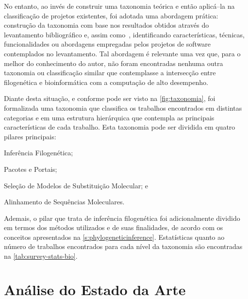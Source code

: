 \documentclass[english,brazilian]{UNISINOSmonografia} %
\begin{document}
No entanto, ao invés de construir uma taxonomia teórica e então aplicá--la na classificação de projetos existentes, foi adotada uma abordagem prática: construção  da taxonomia com base nos resultados obtidos através do levantamento bibliográfico e, assim como~\cite{Perera2013}, identificando características, técnicas, funcionalidades ou abordagens empregadas pelos projetos de software contemplados no levantamento.
Tal abordagem é relevante uma vez que, para o melhor do conhecimento do autor, não foram encontradas nenhuma outra taxonomia ou classificação similar que contemplasse a intersecção entre filogenética e bioinformática com a computação de alto desempenho.


Diante desta situação, e conforme pode ser visto na \autoref{fig:taxonomia}, foi formalizada uma taxonomia que classifica os trabalhos encontrados em distintas categorias e em uma estrutura hierárquica que contempla as principais características de cada trabalho.
Esta taxonomia pode ser dividida em quatro pilares principais:
\begin{inparaenum} 
	\item Inferência Filogenética;
	\item Pacotes e Portais;
	\item Seleção de Modelos de Substituição Molecular; e
	\item Alinhamento de Sequências Moleculares.
\end{inparaenum}


Ademais, o pilar que trata de inferência filogenética foi adicionalmente dividido em termos dos métodos utilizados e de suas finalidades, de acordo com os conceitos apresentados na \autoref{s:phylogeneticinference}.
Estatísticas quanto ao número de trabalhos encontrados para cada nível da taxonomia são encontradas na \autoref{tab:survey-stats-bio}.




\section{Análise do Estado da Arte}
\label{sec:analise-estadodaarte}

\end{document}
